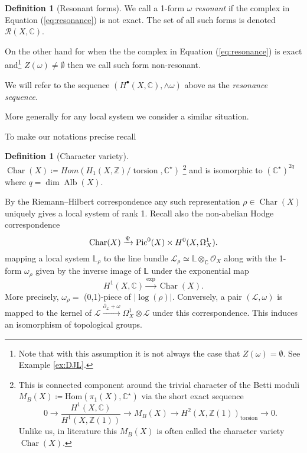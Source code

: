 \documentclass[12pt,reqno]{amsart}
\theoremstyle{question}
\theoremstyle{definition}
\newtheorem{definition}[theorem]{Definition}
\theoremstyle{remark}
\theoremstyle{cited}
\theoremstyle{citeddef}
\newcommand{\C}{\mathbb{C}}
\newcommand{\Hom}{\mathrm{Hom}}
\DeclareMathOperator{\Alb}{Alb}
\DeclareMathOperator{\Char}{Char}
\def\Pic{{\rm Pic}}
\newcommand{\sL}{\mathcal{L}}
\newcommand{\sO}{\mathcal{O}}
\newcommand{\sR}{\mathcal{R}}
\newcommand{\bbC}{\mathbb{C}}
\newcommand{\bbL}{\mathbb{L}}
\newcommand{\bbZ}{\mathbb{Z}}
\DeclareMathOperator{\torsion}{torsion}
\begin{document}
\begin{definition}[Resonant forms]\label{def:resonance}
We call a 1-form $\omega$ \emph{resonant} if the complex 
in Equation (\ref{eq:resonance}) is not exact. The set of all such forms 
is denoted $\sR(X,\bbC)$.

On the other hand for when the the complex 
in Equation (\ref{eq:resonance}) is exact and\footnote{Note that
with this assumption it is not always the case that $Z(\omega) = \emptyset$. See Example \ref{ex:DJL}.} 
$Z(\omega) \neq \emptyset$ then we call such form non-resonant. 


We will refer to the sequence $(H^{\bullet}(X,\bbC), \wedge\omega)$ above as the \emph{resonance sequence}.
\end{definition}




More generally for any local system we consider a similar situation. 



To make our notations precise recall 
\begin{definition}[Character variety]
$\Char(X) \coloneqq Hom(H_1(X, \bbZ)/\torsion, \bbC^{\star})$
\footnote{This is connected component around the trivial character of the Betti moduli $M_B(X) \coloneqq \Hom(\pi_1(X), \bbC^{\star})$ via the short exact sequence \[0\to \frac{H^1(X, \bbC)}{H^1(X, \bbZ(1))}\to M_B(X)\to H^2(X, \bbZ(1))_{\torsion}\to 0.\] Unlike us, in literature this $M_B(X)$ is often called the character variety $\Char(X)$.} and is isomorphic to
$(\bbC^{\star})^{2q}$ where $q = \dim \Alb(X)$.
\end{definition}
By the Riemann--Hilbert correspondence any such representation $\rho\in \Char(X)$ 
uniquely gives a local system of rank 1. 
Recall also the non-abelian Hodge
correspondence
\[\Char(X) \xrightarrow{\Psi} \Pic^{0}(X)\times H^0(X,\Omega_X^1).\]
mapping a local system $\bbL_{\rho}$ to the line bundle $\sL_{\rho}\simeq \bbL\otimes_{\bbC}\sO_X$
along with the 1-form $\omega_{\rho}$ given by the inverse image of $\bbL$ under
the exponential map
\begin{equation}
H^1(X,\bbC) \xrightarrow{\exp} \Char(X).
\label{eq:exponential}
\end{equation}
More precisely, $\omega_{\rho} = $ (0,1)-piece of $|\log(\rho)|$. Conversely, a pair $(\sL, \omega)$ 
is mapped to the kernel of $\sL\xrightarrow{\partial_{\sL}+\omega} \Omega_X^1\otimes \sL$ under this correspondence.
This induces an isomorphism of topological groups. 
\end{document}
